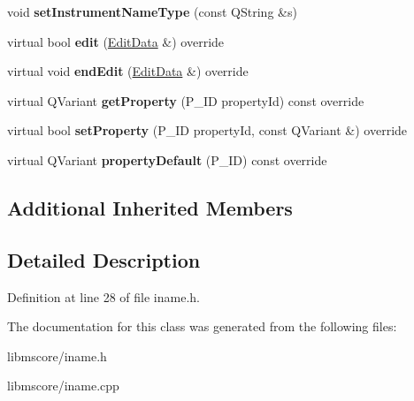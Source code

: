 \begin{DoxyCompactItemize}
void {\bfseries set\+Instrument\+Name\+Type} (const Q\+String \&s)
\item 
\mbox{\label{class_ms_1_1_instrument_name_acd63b0d9d7c53d0f7bfbe689a4346a0e}} 
virtual bool {\bfseries edit} (\hyperlink{class_ms_1_1_edit_data}{Edit\+Data} \&) override
\item 
\mbox{\label{class_ms_1_1_instrument_name_ae15ab9fa85103e1cdaf96c07a66c42fe}} 
virtual void {\bfseries end\+Edit} (\hyperlink{class_ms_1_1_edit_data}{Edit\+Data} \&) override
\item 
\mbox{\label{class_ms_1_1_instrument_name_a4b32f7a49b48b66e8adf4409edb4c1fb}} 
virtual Q\+Variant {\bfseries get\+Property} (P\+\_\+\+ID property\+Id) const override
\item 
\mbox{\label{class_ms_1_1_instrument_name_a46c3ecf740d095f6d53b97daabbd73d2}} 
virtual bool {\bfseries set\+Property} (P\+\_\+\+ID property\+Id, const Q\+Variant \&) override
\item 
\mbox{\label{class_ms_1_1_instrument_name_a4c7279b5a521a18bec607255b4b4a8db}} 
virtual Q\+Variant {\bfseries property\+Default} (P\+\_\+\+ID) const override
\end{DoxyCompactItemize}
\subsection*{Additional Inherited Members}


\subsection{Detailed Description}


Definition at line 28 of file iname.\+h.



The documentation for this class was generated from the following files\+:\begin{DoxyCompactItemize}
\item 
libmscore/iname.\+h\item 
libmscore/iname.\+cpp\end{DoxyCompactItemize}
